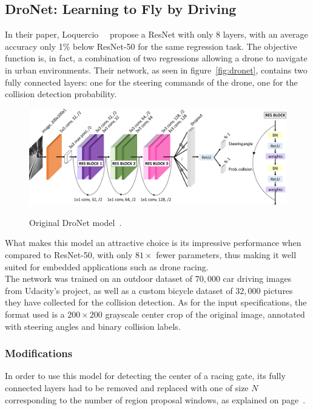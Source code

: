 \subsection{DroNet: Learning to Fly by Driving}

In their paper, Loquercio \etal~\cite{dronet}~propose a ResNet with only 8
layers, with an average accuracy only 1\% below ResNet-50 for the same
regression task. The objective function is, in fact, a combination of two
regressions allowing a drone to navigate in urban environments. Their network,
as seen in figure~\ref{fig:dronet}, contains two fully connected
layers: one for the steering commands of the drone, one for the collision
detection probability.

\begin{figure}[h]
	\center
	\includegraphics[width=\textwidth]{figure/dronet.png}
	\label{fig:dronetoriginal}
	\caption{Original DroNet model~\cite{dronet}.}
\end{figure}

What makes this model an attractive choice is its impressive performance when
compared to ResNet-50, with only $81\times$ fewer parameters, thus making it
well suited for embedded applications such as drone racing.\\

The network was trained on an outdoor dataset of $70,000$ car driving images
from Udacity's project, as well as a custom bicycle dataset of $32,000$
pictures they have collected for the collision detection. As for the input
specifications, the format used is a $200\times200$ grayscale center crop of
the original image, annotated with steering angles and binary collision labels.

\subsubsection{Modifications} \label{section:dronet-mods}

In order to use this model for detecting the center of a racing gate, its fully
connected layers had to be removed and replaced with one of size $N$
corresponding to the number of region proposal windows, as explained on
page~\pageref{fig:regionproposal}. 

